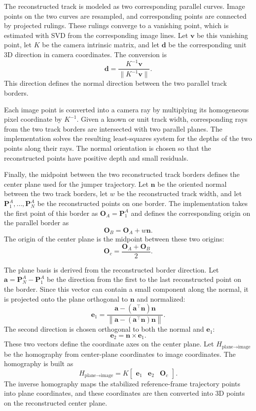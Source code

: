 The reconstructed track is modeled as two corresponding parallel curves. Image points on the two curves are resampled, and corresponding points are connected by projected rulings. These rulings converge to a vanishing point, which is estimated with SVD from the corresponding image lines. Let \(\mathbf{v}\) be this vanishing point, let \(K\) be the camera intrinsic matrix, and let \(\mathbf{d}\) be the corresponding unit 3D direction in camera coordinates. The conversion is
\[
\mathbf{d} = \frac{K^{-1}\mathbf{v}}{\|K^{-1}\mathbf{v}\|}.
\]
This direction defines the normal direction between the two parallel track borders.

Each image point is converted into a camera ray by multiplying its homogeneous pixel coordinate by \(K^{-1}\). Given a known or unit track width, corresponding rays from the two track borders are intersected with two parallel planes. The implementation solves the resulting least-squares system for the depths of the two points along their rays. The normal orientation is chosen so that the reconstructed points have positive depth and small residuals.

Finally, the midpoint between the two reconstructed track borders defines the center plane used for the jumper trajectory. Let \(\mathbf{n}\) be the oriented normal between the two track borders, let \(w\) be the reconstructed track width, and let \(\mathbf{P}^A_1,\ldots,\mathbf{P}^A_N\) be the reconstructed points on one border. The implementation takes the first point of this border as \(\mathbf{O}_A=\mathbf{P}^A_1\) and defines the corresponding origin on the parallel border as
\[
\mathbf{O}_B = \mathbf{O}_A + w\mathbf{n}.
\]
The origin of the center plane is the midpoint between these two origins:
\[
\mathbf{O}_c = \frac{\mathbf{O}_A+\mathbf{O}_B}{2}.
\]

The plane basis is derived from the reconstructed border direction. Let \(\mathbf{a}=\mathbf{P}^A_N-\mathbf{P}^A_1\) be the direction from the first to the last reconstructed point on the border. Since this vector can contain a small component along the normal, it is projected onto the plane orthogonal to \(\mathbf{n}\) and normalized:
\[
\mathbf{e}_1 =
\frac{\mathbf{a}-(\mathbf{a}^\top\mathbf{n})\mathbf{n}}
{\left\|\mathbf{a}-(\mathbf{a}^\top\mathbf{n})\mathbf{n}\right\|}.
\]
The second direction is chosen orthogonal to both the normal and \(\mathbf{e}_1\):
\[
\mathbf{e}_2 = \mathbf{n}\times\mathbf{e}_1.
\]
These two vectors define the coordinate axes on the center plane. Let \(H_{\text{plane}\rightarrow\text{image}}\) be the homography from center-plane coordinates to image coordinates. The homography is built as
\[
H_{\text{plane}\rightarrow\text{image}} = K
\begin{bmatrix}
\mathbf{e}_1 & \mathbf{e}_2 & \mathbf{O}_c
\end{bmatrix}.
\]
The inverse homography maps the stabilized reference-frame trajectory points into plane coordinates, and these coordinates are then converted into 3D points on the reconstructed center plane.
